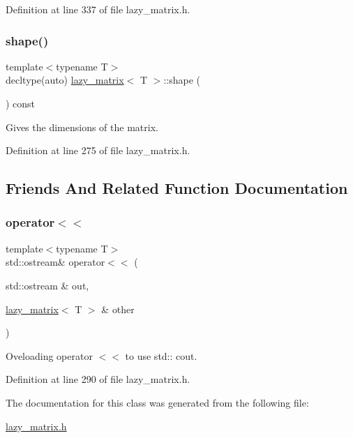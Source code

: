 Definition at line 337 of file lazy\+\_\+matrix.\+h.

\mbox{\label{classlazy__matrix_a01de84f2c1dcaff51f2ac1eeee3427c6}} 
\subsubsection{\texorpdfstring{shape()}{shape()}}
{\footnotesize\ttfamily template$<$typename T$>$ \\
decltype(auto) \mbox{\hyperlink{classlazy__matrix}{lazy\+\_\+matrix}}$<$ T $>$\+::shape (\begin{DoxyParamCaption}{ }\end{DoxyParamCaption}) const\hspace{0.3cm}{\ttfamily [inline]}}



Gives the dimensions of the matrix. 



Definition at line 275 of file lazy\+\_\+matrix.\+h.



\subsection{Friends And Related Function Documentation}
\mbox{\label{classlazy__matrix_a2840b44da6b181bb3dfbdf8ffd104fec}} 
\subsubsection{\texorpdfstring{operator$<$$<$}{operator<<}}
{\footnotesize\ttfamily template$<$typename T$>$ \\
std\+::ostream\& operator$<$$<$ (\begin{DoxyParamCaption}\item[{std\+::ostream \&}]{out,  }\item[{\mbox{\hyperlink{classlazy__matrix}{lazy\+\_\+matrix}}$<$ T $>$ \&}]{other }\end{DoxyParamCaption})\hspace{0.3cm}{\ttfamily [friend]}}



Oveloading operator $<$$<$ to use std\+:\+: cout. 



Definition at line 290 of file lazy\+\_\+matrix.\+h.



The documentation for this class was generated from the following file\+:\begin{DoxyCompactItemize}
\item 
\mbox{\hyperlink{lazy__matrix_8h}{lazy\+\_\+matrix.\+h}}\end{DoxyCompactItemize}
